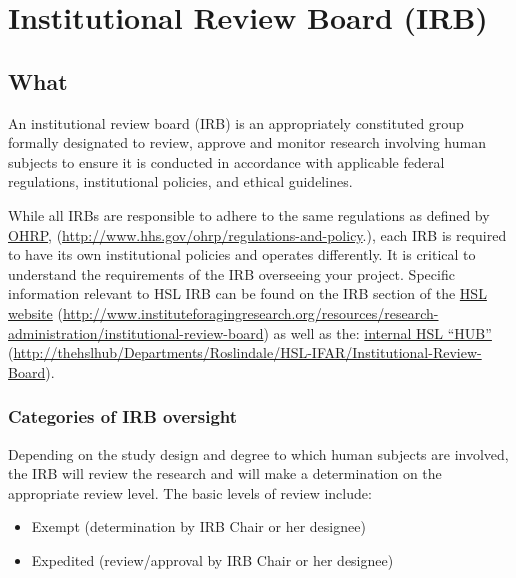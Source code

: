 \documentclass[]{book}
\providecommand{\tightlist}{%
  \setlength{\itemsep}{0pt}\setlength{\parskip}{0pt}}
\begin{document}
\section{Institutional Review Board
(IRB)}\label{institutional-review-board-irb}

\subsection{What}\label{what-5}

An institutional review board (IRB) is an appropriately constituted
group formally designated to review, approve and monitor research
involving human subjects to ensure it is conducted in accordance with
applicable federal regulations, institutional policies, and ethical
guidelines.

While all IRBs are responsible to adhere to the same regulations as
defined by \href{http://www.hhs.gov/ohrp/regulations-and-policy}{OHRP},
(\url{http://www.hhs.gov/ohrp/regulations-and-policy}.), each IRB is
required to have its own institutional policies and operates
differently. It is critical to understand the requirements of the IRB
overseeing your project. Specific information relevant to HSL IRB can be
found on the IRB section of the
\href{http://www.instituteforagingresearch.org/resources/research-administration/institutional-review-board}{HSL
website}
(\url{http://www.instituteforagingresearch.org/resources/research-administration/institutional-review-board})
as well as the:
\href{http://thehslhub/Departments/Roslindale/HSL-IFAR/Institutional-Review-Board}{internal
HSL ``HUB''}
(\url{http://thehslhub/Departments/Roslindale/HSL-IFAR/Institutional-Review-Board}).

\subsubsection{Categories of IRB
oversight}\label{categories-of-irb-oversight}

Depending on the study design and degree to which human subjects are
involved, the IRB will review the research and will make a determination
on the appropriate review level. The basic levels of review include:

\begin{itemize}
\tightlist
\item
  Exempt (determination by IRB Chair or her designee)
\item
  Expedited (review/approval by IRB Chair or her designee)
\end{itemize}
\end{document}
